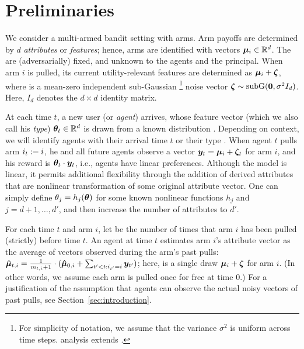 \section{Preliminaries}
\label{sec:prob}

We consider a multi-armed bandit setting with \ARMNUM arms.
Arm payoffs are determined by $d$ \emph{attributes} or \emph{features};
hence, arms are identified with vectors $\ArmV{i} \in \R^d$.
The  are (adversarially) fixed, and unknown to the agents
and the principal.
When arm $i$ is pulled, its current utility-relevant features are
determined as $\ArmV{i} + \NoiseV$, where \NoiseV is a mean-zero independent  sub-Gaussian%
\footnote{For simplicity of notation, we assume that the variance 
  $\sigma^2$ is uniform across time steps.
   analysis extends .}
noise vector $\NoiseV \sim \Normal{\vc{0}}{\sigma^2 I_{d}}$.
Here, $I_d$ denotes the $d \times d$ identity matrix.

At each time $t$, a new user (or \emph{agent}) arrives,
whose feature vector (which we also call his \emph{type})
$\AgentV{t} \in \R^d$ is drawn from a known distribution \AgentDist.
Depending on context, we will identify agents with their arrival time
$t$ or their type .
When agent $t$ pulls arm $\Pull{t} := i$,
he and all future agents observe a vector
$\ObsV{t} = \ArmV{i} + \NoiseV[t]$ for arm $i$,
and his reward is $\AgentV{t} \cdot \ObsV{t}$,
i.e., agents have linear preferences.
Although the model is linear, it permits additional flexibility
through the addition of derived attributes that are nonlinear
transformation of some original attribute vector.
One can simply define $\Ag{j} = h_j(\AgV)$ for some known
nonlinear functions $h_j$ and $j=d+1,\ldots,d'$, and then increase the
number of attributes to $d'$.

For each time $t$ and arm $i$, let  be the number of
times that arm $i$ has been pulled (strictly) before time $t$.
An agent at time $t$ estimates arm $i$'s attribute vector as the
average of vectors observed during the arm's past pulls:
$\ArmEV{t}{i} = \frac{1}{\NumPull{t}{i}+1} \cdot
(\ArmEV{0}{i} + \sum_{t'<t: \Pull{t'} = i} \ObsV{t'})$;
here,  is a single draw $\ArmV{i} + \NoiseV$ for arm $i$.
(In other words, we assume each arm is pulled once for free at time 0.)
For a justification of the assumption that agents can observe
the actual noisy vectors  of past pulls, see
Section~\ref{sec:introduction}.
  
